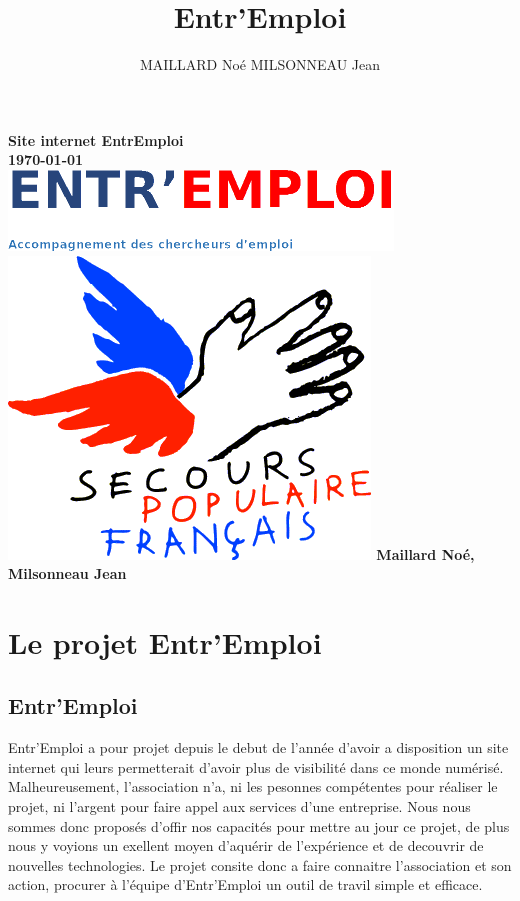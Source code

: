 \documentclass[a4paper, 12pt]{report}
\title{Entr'Emploi}
\author{MAILLARD Noé MILSONNEAU Jean}
\begin{document}
\begin{titlepage}
	\thispagestyle{empty}
    \centering
    {\bfseries\Large
    		Site internet EntrEmploi\\
        \today\\
        \vskip3cm
        \includegraphics{../../public/images/Logo-entremploi-md.png}
        \vskip15mm
        \includegraphics{../../public/images/Logo-spf.png}
        \vskip3cm
        Maillard Noé, Milsonneau Jean\\
    }
    \normalsize
\end{titlepage}

\tableofcontents
\chapter{Le projet Entr'Emploi}
\thispagestyle{fancy}
\section{Entr'Emploi}
Entr'Emploi a pour projet depuis le debut de l'année d'avoir a disposition un site internet qui leurs permetterait d'avoir plus de visibilité
dans ce monde numérisé. Malheureusement, l'association n'a, ni les pesonnes compétentes pour réaliser le projet, ni l'argent pour faire appel aux services d'une entreprise.
Nous nous sommes donc proposés d'offir nos capacités pour mettre au jour ce projet, de plus nous y voyions un exellent moyen d'aquérir de l'expérience et de decouvrir de nouvelles technologies.
Le projet consite donc a faire connaitre l'association et son action, procurer à l'équipe d'Entr'Emploi un outil de travil simple et efficace.
\end{document}
